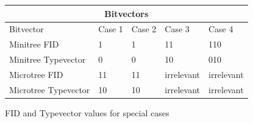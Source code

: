 \documentclass{article}
\begin{document}
\begin{figure}[ht]
	\begin{tabular}{ |p{4cm}||p{1.5cm}|p{1.5cm}|p{1.5cm}|p{1.5cm}|  }
		 \hline
		 \multicolumn{5}{|c|}{Bitvectors} \\
		 \hline
		 Bitvector & Case 1 &Case 2&Case 3&Case 4\\
		 \hline
		 Minitree FID   & 1    & 1&   11 & 110\\
		 Minitree Typevector&   0  & 0   & 10 & 010\\
		 Microtree FID&11 &11&  irrelevant&irrelevant\\
		 Microtree Typevector&10& 10&  irrelevant&irrelevant\\
		 \hline
	\end{tabular}
\caption{FID and Typevector values for special cases}
\label{rank:table4}
\end{figure}
\end{document}
